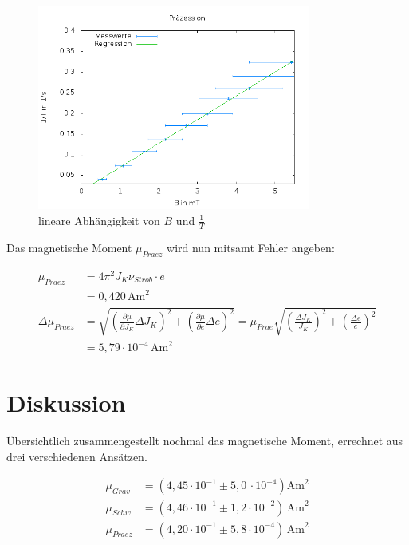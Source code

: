 \begin{figure}[H]
\includegraphics[width=0.8\textwidth] {pics/Praezession.png}
\centering
\caption{lineare Abhängigkeit von $B$ und $\frac1T$}
\label{picpräz}
\end{figure}

Das magnetische Moment $\mu_{Praez}$ wird nun mitsamt Fehler angeben:

\begin{align}
 \nonumber
 \mu_{Praez} &= 4\pi^2 J_K \nu_{Strob} \cdot e \\
 &= 0,420\, \text{Am}^2\\
 \nonumber
 \Delta \mu_{Praez} &= \sqrt{\left(\frac{\partial \mu}{\partial J_{K}}\Delta J_{K} \right)^2 + \left(\frac{\partial \mu}{\partial e}\Delta e \right)^2} = \mu_{Prae} \sqrt{\left( \frac{\Delta J_{K}}{J_{K}}\right)^2 + \left( \frac{\Delta e}{e}\right)^2}\\
 &= 5,79 \cdot 10^{-4}\, \text{Am}^2
\end{align}

\section{Diskussion}
Übersichtlich zusammengestellt nochmal das magnetische Moment, errechnet aus drei verschiedenen Ansätzen.

\begin{align*}
 \mu_{Grav} &= (4,45 \cdot 10^{-1} \pm 5,0\, \cdot 10^{-4}) \text{Am}^2\\
 \mu_{Schw} &= (4,46 \cdot 10^{-1} \pm 1,2 \cdot 10^{-2})\, \text{Am}^2\\
 \mu_{Praez} &= (4,20 \cdot 10^{-1} \pm 5,8 \cdot 10^{-4})\, \text{Am}^2\\
\end{align*}

